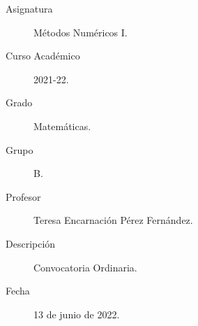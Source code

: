 \documentclass[12pt]{article}
\begin{document}

    
    

    \begin{description}
        \item[Asignatura] Métodos Numéricos I.
        \item[Curso Académico] 2021-22.
        \item[Grado] Matemáticas.
        \item[Grupo] B.
        \item[Profesor] Teresa Encarnación Pérez Fernández.
        \item[Descripción] Convocatoria Ordinaria.
        \item[Fecha] 13 de junio de 2022.
    
    \end{description}
    \newpage
    
\end{document}
